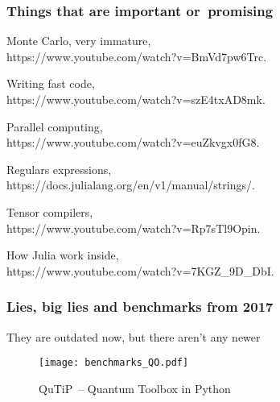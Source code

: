 \documentclass[10pt,t]{beamer}
\begin{document}
\begin{frame}
  \frametitle{Things that are important or~promising}


  Monte Carlo, very immature, \\
  {https://www.youtube.com/watch?v=BmVd7pw6Trc}.

  \vspace{0.3em}



  Writing fast code, \\
  {https://www.youtube.com/watch?v=szE4txAD8mk}.

  \vspace{0.3em}



  Parallel computing, \\
  {https://www.youtube.com/watch?v=euZkvgx0fG8}.

  \vspace{0.3em}



  Regulars expressions, \\
  {https://docs.julialang.org/en/v1/manual/strings/}.

  \vspace{0.3em}



  Tensor compilers, \\
  {https://www.youtube.com/watch?v=Rp7sTl9Opin}.

  \vspace{0.3em}



  How Julia work inside, \\
  {https://www.youtube.com/watch?v=7KGZ\_9D\_DbI}.

\end{frame}





\begin{frame}
  \frametitle{Lies, big lies and benchmarks from 2017}


  {They are outdated now, but there aren't any newer}


  \begin{figure}

    \centering

    \texttt{[image: benchmarks\_QO.pdf]}

    \caption{QuTiP~-- Quantum Toolbox in Python}

  \end{figure}

\end{frame}
\end{document}
